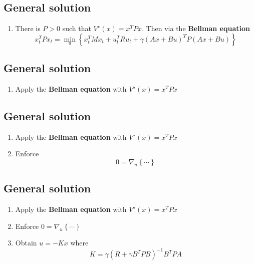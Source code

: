 \documentclass[
  letterpaper,
  DIV=11,
  numbers=noendperiod,
  oneside]{scrartcl}
\providecommand{\tightlist}{%
  \setlength{\itemsep}{0pt}\setlength{\parskip}{0pt}}\usepackage{longtable,booktabs,array}
\begin{document}
\subsection{General solution}\label{general-solution}

\begin{enumerate}
\def\labelenumi{\arabic{enumi}.}
\tightlist
\item
  There is \(P > 0\) such that \(V^\star (x) = x^T P x\). Then via the
  \textbf{Bellman equation}
  \[x_{t}^{T} P x_t = \min_{u} \left\{ x_{t}^{T} M x_t +  u_{t}^{T} R u_t + \gamma \left( A x + B u \right)^{T} P \left( A x + B u \right) \right\}\]
\end{enumerate}

\subsection{General solution}\label{general-solution-1}

\begin{enumerate}
\def\labelenumi{\arabic{enumi}.}
\tightlist
\item
  Apply the \textbf{Bellman equation} with \(V^\star (x) = x^T P x\)
\end{enumerate}

\subsection{General solution}\label{general-solution-2}

\begin{enumerate}
\def\labelenumi{\arabic{enumi}.}
\tightlist
\item
  Apply the \textbf{Bellman equation} with \(V^\star (x) = x^T P x\)
\item
  Enforce \[0 = \nabla_u \left\{ \cdots \right\}\]
\end{enumerate}

\subsection{General solution}\label{general-solution-3}

\begin{enumerate}
\def\labelenumi{\arabic{enumi}.}
\tightlist
\item
  Apply the \textbf{Bellman equation} with \(V^\star (x) = x^T P x\)
\item
  Enforce \(0 = \nabla_u \left\{ \cdots \right\}\)
\item
  Obtain \(u = -K x\) where
  \[K = \gamma \left( R + \gamma B^T P B \right)^{-1} B^T P A\]
\end{enumerate}
\end{document}
